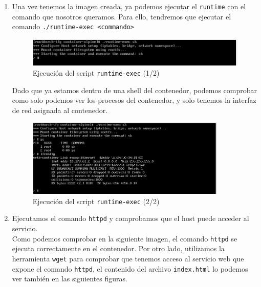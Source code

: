 \documentclass[a4paper, oneside, 12pt]{book}
\begin{document}
\begin{enumerate}
		\item Una vez tenemos la imagen creada, ya podemos ejecutar el \texttt{runtime} con el comando que nosotros queramos. Para ello, tendremos que ejecutar el comando \texttt{./runtime-exec <commando>}
		
		\begin{figure}[h!]
			\begin{center}
				\includegraphics[width=1\textwidth]{img/container_runtime1.png}
				\caption{Ejecución del script \texttt{runtime-exec} (1/2)}
			\end{center}
		\end{figure}
	
		\noindent Dado que ya estamos dentro de una shell del contenedor, podemos comprobar como solo podemos ver los procesos del contenedor, y solo tenemos la interfaz de red asignada al contenedor.
		
		\begin{figure}[h!]
			\begin{center}
				\includegraphics[width=0.9\textwidth]{img/container_runtime2.png}
				\caption{Ejecución del script \texttt{runtime-exec} (2/2)}
			\end{center}
		\end{figure}
	
		\item Ejecutamos el comando \texttt{httpd} y comprobamos que el host puede acceder al servicio. \\
		
		\noindent Como podemos comprobar en la siguiente imagen, el comando \texttt{httpd} se ejecuta correctamente en el contenedor. Por otro lado, utilizamos la herramienta \texttt{wget} para comprobar que tenemos acceso al servicio web que expone el comando \texttt{httpd}, el contenido del archivo \texttt{index.html} lo podemos ver también en las siguientes figuras.
		

\end{enumerate}
\end{document}
